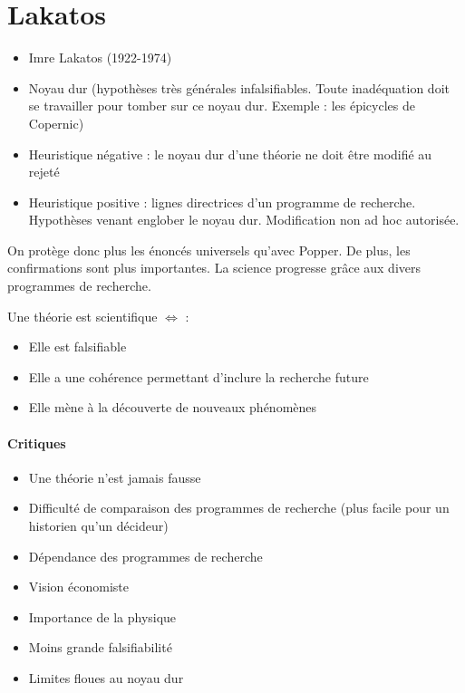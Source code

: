 \documentclass[fleqn,letterpaper, 12pt]{article}
\begin{document}
	\section{Lakatos}
	
	\begin{itemize}
		\item Imre Lakatos (1922-1974)
		\item Noyau dur (hypothèses très générales infalsifiables. Toute inadéquation doit se travailler pour tomber sur ce noyau dur. Exemple : les épicycles de Copernic)
		\item Heuristique négative : le noyau dur d'une théorie ne doit être modifié au rejeté
		\item Heuristique positive : lignes directrices d'un programme de recherche. Hypothèses venant englober le noyau dur. Modification non ad hoc autorisée.
	\end{itemize}

	On protège donc plus les énoncés universels qu'avec Popper. De plus, les confirmations sont plus importantes. La science progresse grâce aux divers programmes de recherche.

	Une théorie est scientifique $\Leftrightarrow$ :
	\begin{itemize}
		\item Elle est falsifiable
		\item Elle a une cohérence permettant d'inclure la recherche future
		\item Elle mène à la découverte de nouveaux phénomènes
	\end{itemize}
	
	\paragraph{Critiques}
	\begin{itemize}
		\item Une théorie n'est jamais fausse
		\item Difficulté de comparaison des programmes de recherche (plus facile pour un historien qu'un décideur)
		\item Dépendance des programmes de recherche
		\item Vision économiste
		\item Importance de la physique
		\item Moins grande falsifiabilité
		\item Limites floues au noyau dur
	\end{itemize}
\end{document}

